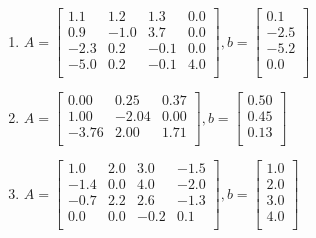 \documentclass[a4paper]{article}
\begin{document}
\begin{enumerate}
\begin{enumerate}
  \item %
    $A = \begin{bmatrix}
      1.1 & 1.2 & 1.3 & 0.0\\
      0.9 & -1.0 & 3.7 & 0.0\\
      -2.3 & 0.2 & -0.1 & 0.0\\
      -5.0 & 0.2 & -0.1 & 4.0\\
      \end{bmatrix},
      b= \begin{bmatrix}
        0.1\\
        -2.5\\
        -5.2\\
        0.0\\
      \end{bmatrix}$

  \item %
    $A = \begin{bmatrix}
      0.00 & 0.25 & 0.37\\
      1.00 & -2.04 & 0.00\\
      -3.76 & 2.00 & 1.71\\
      \end{bmatrix},
      b= \begin{bmatrix}
        0.50\\
        0.45\\
        0.13\\
      \end{bmatrix}$

  \item %
    $A = \begin{bmatrix}
      1.0 & 2.0 & 3.0 & -1.5\\
      -1.4 & 0.0 & 4.0 & -2.0\\
      -0.7 & 2.2 & 2.6 & -1.3\\
      0.0 & 0.0 & -0.2 & 0.1\\
      \end{bmatrix},
      b= \begin{bmatrix}
        1.0\\
        2.0\\
        3.0\\
        4.0\\
      \end{bmatrix}$


\end{enumerate}
\end{enumerate}
\end{document}
